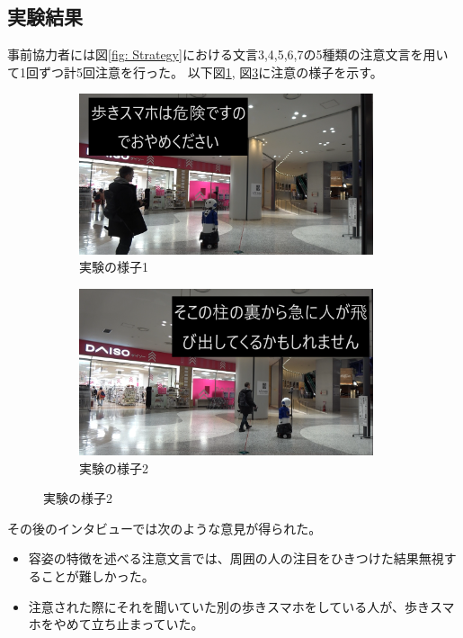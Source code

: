 \documentclass{kuisthesis}
\begin{document}
\subsection{実験結果}
事前協力者には図\ref{fig: Strategy}における文言3,4,5,6,7の5種類の注意文言を用いて1回ずつ計5回注意を行った。
以下図\ref{fig: Experimentjani}, 図\ref{fig: Experimentjani2}に注意の様子を示す。
\begin{figure}[h]
  \begin{subfigure}{0.5\textwidth}
    \centering
    \includegraphics[width=0.95\textwidth]{img/jani2.png}
    \caption{実験の様子1}
    \label{fig: Experimentjani}
  \end{subfigure}
  \begin{subfigure}{0.5\textwidth}
    \centering
    \includegraphics[width=0.95\textwidth]{img/jani3.png}
    \caption{実験の様子2}
    \label{fig: Experimentjani2}
  \end{subfigure}
\end{figure}
その後のインタビューでは次のような意見が得られた。
\begin{itemize}
  \item 容姿の特徴を述べる注意文言では、周囲の人の注目をひきつけた結果無視することが難しかった。
  \item 注意された際にそれを聞いていた別の歩きスマホをしている人が、歩きスマホをやめて立ち止まっていた。
\end{itemize}
\end{document}
